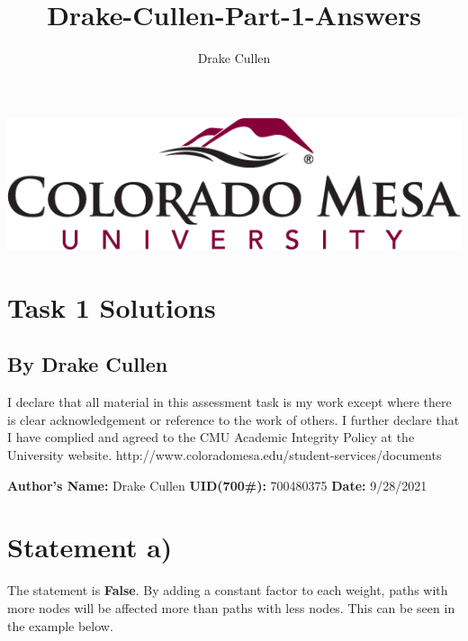 \documentclass[11pt]{article}
\title{Drake-Cullen-Part-1-Answers}
\author{Drake Cullen}
\begin{document}
\begin{minipage}{\linewidth}%
\centering
\includegraphics[keepaspectratio=true,scale=0.35]{CMU.png}
\end{minipage}
\section*{ \centering Task 1 Solutions}
\subsection*{ \centering By Drake Cullen} 

\vspace{5mm}
 
I declare that all material in this assessment task is my work except where there is clear acknowledgement or reference to the work of others. I further declare that I have complied and agreed to the CMU Academic Integrity Policy at the University website. http://www.coloradomesa.edu/student-services/documents
\begin{center}
\textbf{Author’s Name:} Drake Cullen 
\textbf{UID(700\#):} 700480375
\textbf{ Date:} 9/28/2021
\end{center} 

\section{Statement a)}
The statement is \textbf{False}. By adding a constant factor to each weight, paths with more nodes will be affected more than paths with less nodes. This can be seen in the example below. 
\end{document}
